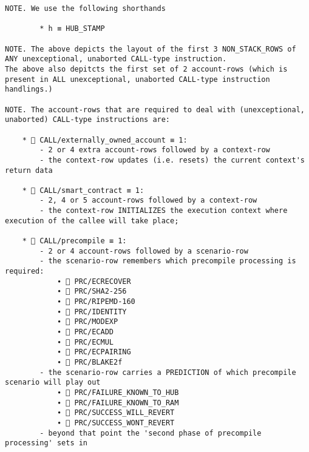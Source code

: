 \documentclass[varwidth=\maxdimen,margin=0.5cm,multi={verbatim}]{standalone}
\begin{document}
\begin{verbatim}
NOTE. We use the following shorthands

        * h ≡ HUB_STAMP

NOTE. The above depicts the layout of the first 3 NON_STACK_ROWS of ANY unexceptional, unaborted CALL-type instruction.
The above also depitcts the first set of 2 account-rows (which is present in ALL unexceptional, unaborted CALL-type instruction handlings.)

NOTE. The account-rows that are required to deal with (unexceptional, unaborted) CALL-type instructions are:

    *  CALL/externally_owned_account ≡ 1:
        - 2 or 4 extra account-rows followed by a context-row
        - the context-row updates (i.e. resets) the current context's return data

    *  CALL/smart_contract ≡ 1:
        - 2, 4 or 5 account-rows followed by a context-row
        - the context-row INITIALIZES the execution context where execution of the callee will take place;

    *  CALL/precompile ≡ 1:
        - 2 or 4 account-rows followed by a scenario-row
        - the scenario-row remembers which precompile processing is required:
            ∙  PRC/ECRECOVER
            ∙  PRC/SHA2-256
            ∙  PRC/RIPEMD-160
            ∙  PRC/IDENTITY
            ∙  PRC/MODEXP
            ∙  PRC/ECADD
            ∙  PRC/ECMUL
            ∙  PRC/ECPAIRING
            ∙  PRC/BLAKE2f
        - the scenario-row carries a PREDICTION of which precompile scenario will play out
            ∙  PRC/FAILURE_KNOWN_TO_HUB
            ∙  PRC/FAILURE_KNOWN_TO_RAM
            ∙  PRC/SUCCESS_WILL_REVERT
            ∙  PRC/SUCCESS_WONT_REVERT
        - beyond that point the 'second phase of precompile processing' sets in

\end{verbatim}
\end{document}

